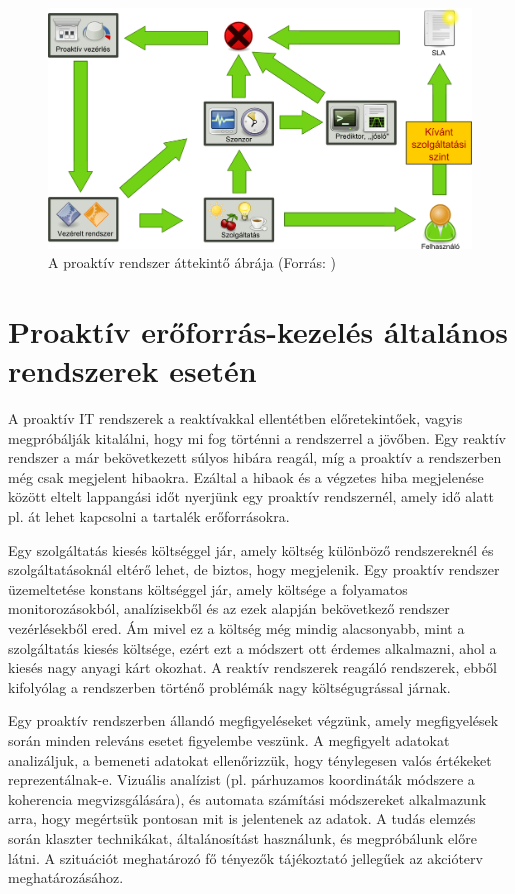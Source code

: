 \begin{figure}[h!]
\centering
\includegraphics[width=1.00\textwidth]{figures/proactive_system.png}
\caption{A proaktív rendszer áttekintő ábrája (Forrás: \cite{patariczapro}) \label{fig:proactive_system}}
\end{figure}

\section{Proaktív erőforrás-kezelés általános rendszerek esetén}

A proaktív IT rendszerek a reaktívakkal ellentétben előretekintőek, vagyis megpróbálják kitalálni, hogy mi fog történni a rendszerrel a jövőben. Egy reaktív rendszer a már bekövetkezett súlyos hibára reagál, míg a proaktív a rendszerben még csak megjelent hibaokra. Ezáltal a hibaok és a végzetes hiba megjelenése között eltelt lappangási időt nyerjünk egy proaktív rendszernél, amely idő alatt pl. át lehet kapcsolni a tartalék erőforrásokra.

Egy szolgáltatás kiesés költséggel jár, amely költség különböző rendszereknél és szolgáltatásoknál eltérő lehet, de biztos, hogy megjelenik. Egy proaktív rendszer üzemeltetése konstans költséggel jár, amely költsége a folyamatos monitorozásokból, analízisekből és az ezek alapján bekövetkező rendszer vezérlésekből ered. Ám mivel ez a költség még mindig alacsonyabb, mint a szolgáltatás kiesés költsége, ezért ezt a módszert ott érdemes alkalmazni, ahol a kiesés nagy anyagi kárt okozhat. A reaktív rendszerek reagáló rendszerek, ebből kifolyólag a rendszerben történő problémák nagy költségugrással járnak.

Egy proaktív rendszerben állandó megfigyeléseket végzünk, amely megfigyelések során minden releváns esetet figyelembe veszünk. A megfigyelt adatokat analizáljuk, a bemeneti adatokat ellenőrizzük, hogy ténylegesen valós értékeket reprezentálnak-e. Vizuális analízist (pl. párhuzamos koordináták módszere a koherencia megvizsgálására), és automata számítási módszereket alkalmazunk arra, hogy megértsük pontosan mit is jelentenek az adatok. A tudás elemzés során klaszter technikákat, általánosítást használunk, és megpróbálunk előre látni. A szituációt meghatározó fő tényezők tájékoztató jellegűek az akcióterv meghatározásához.

